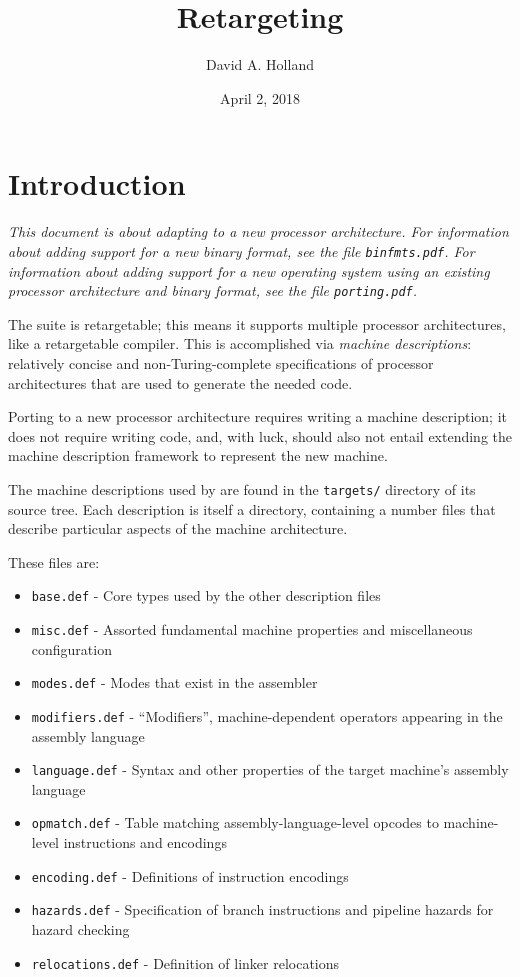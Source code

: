 

\title{Retargeting \bintools}
\author{David A. Holland}
\date{April 2, 2018}


\maketitle

\section{Introduction}

\textit{
This document is about adapting {\bintools} to a new processor
architecture.
For information about adding support for a new binary format, see
the file \texttt{binfmts.pdf}.
For information about adding support for a new operating system using
an existing processor architecture and binary format, see the file
\texttt{porting.pdf}.
}

The {\bintools} suite is retargetable; this means it supports multiple
processor architectures, like a retargetable compiler.
This is accomplished via \emph{machine descriptions}: relatively
concise and non-Turing-complete specifications of processor
architectures that are used to generate the needed code.

Porting {\bintools} to a new processor architecture requires writing a
machine description; it does not require writing code, and, with luck,
should also not entail extending the machine description framework to
represent the new machine.

The machine descriptions used by {\bintools} are found in the
\texttt{targets/} directory of its source tree.
Each description is itself a directory, containing a number files that
describe particular aspects of the machine architecture.

These files are:
\begin{itemize}
\item \texttt{base.def} - Core types used by the other description files
\item \texttt{misc.def} - Assorted fundamental machine properties and
miscellaneous configuration
\item \texttt{modes.def} - Modes that exist in the assembler 
\item \texttt{modifiers.def} - ``Modifiers'', machine-dependent
operators appearing in the assembly language
\item \texttt{language.def} - Syntax and other properties of the
target machine's assembly language
\item \texttt{opmatch.def} - Table matching assembly-language-level
opcodes to machine-level instructions and encodings
\item \texttt{encoding.def} - Definitions of instruction encodings
\item \texttt{hazards.def} - Specification of branch instructions and
pipeline hazards for hazard checking
\item \texttt{relocations.def} - Definition of linker relocations
\end{itemize}

